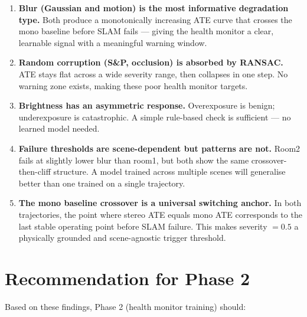 \documentclass[11pt, a4paper]{article}
\begin{document}
\begin{enumerate}
    \item \textbf{Blur (Gaussian and motion) is the most informative degradation type.}
          Both produce a monotonically increasing ATE curve that crosses the mono
          baseline before SLAM fails --- giving the health monitor a clear, learnable
          signal with a meaningful warning window.

    \item \textbf{Random corruption (S\&P, occlusion) is absorbed by RANSAC.}
          ATE stays flat across a wide severity range, then collapses in one step.
          No warning zone exists, making these poor health monitor targets.

    \item \textbf{Brightness has an asymmetric response.}
          Overexposure is benign; underexposure is catastrophic. A simple rule-based
          check is sufficient --- no learned model needed.

    \item \textbf{Failure thresholds are scene-dependent but patterns are not.}
          Room2 fails at slightly lower blur than room1, but both show the same
          crossover-then-cliff structure. A model trained across multiple scenes
          will generalise better than one trained on a single trajectory.

    \item \textbf{The mono baseline crossover is a universal switching anchor.}
          In both trajectories, the point where stereo ATE equals mono ATE corresponds
          to the last stable operating point before SLAM failure. This makes
          severity $= 0.5$ a physically grounded and scene-agnostic trigger threshold.
\end{enumerate}

\section{Recommendation for Phase 2}

Based on these findings, Phase 2 (health monitor training) should:
\end{document}
